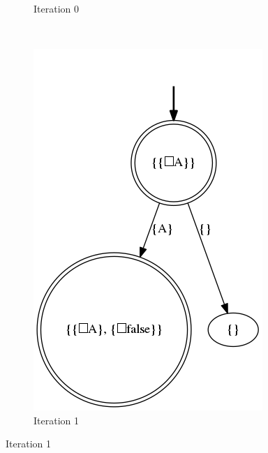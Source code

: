 \begin{example}
\begin{figure}[h]
\begin{subfigure}[b]{0.20\textwidth}
			 	\caption{Iteration 0}
			 	\label{fig:exa-on-the-fly-always-A-it-0}
	\end{subfigure}
	~ %
	\begin{subfigure}[b]{0.35\textwidth}
		\includegraphics[width=\textwidth]{images/on-the-fly-always-A-it-1}
		\caption{Iteration 1}
		\label{fig:exa-on-the-fly-always-A-it-1}
	\end{subfigure}
	

\end{figure}
\end{example}

